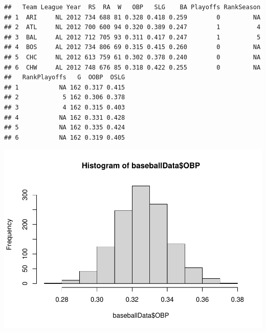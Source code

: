 \documentclass[
]{article}
\newenvironment{Shaded}{\begin{snugshade}}{\end{snugshade}}
\newcommand{\KeywordTok}[1]{\textcolor[rgb]{0.13,0.29,0.53}{\textbf{#1}}}
\newcommand{\NormalTok}[1]{#1}
\newcommand{\OperatorTok}[1]{\textcolor[rgb]{0.81,0.36,0.00}{\textbf{#1}}}
\begin{document}
\begin{verbatim}
##   Team League Year  RS  RA  W   OBP   SLG    BA Playoffs RankSeason
## 1  ARI     NL 2012 734 688 81 0.328 0.418 0.259        0         NA
## 2  ATL     NL 2012 700 600 94 0.320 0.389 0.247        1          4
## 3  BAL     AL 2012 712 705 93 0.311 0.417 0.247        1          5
## 4  BOS     AL 2012 734 806 69 0.315 0.415 0.260        0         NA
## 5  CHC     NL 2012 613 759 61 0.302 0.378 0.240        0         NA
## 6  CHW     AL 2012 748 676 85 0.318 0.422 0.255        0         NA
##   RankPlayoffs   G  OOBP  OSLG
## 1           NA 162 0.317 0.415
## 2            5 162 0.306 0.378
## 3            4 162 0.315 0.403
## 4           NA 162 0.331 0.428
## 5           NA 162 0.335 0.424
## 6           NA 162 0.319 0.405
\end{verbatim}

\begin{Shaded}
\end{Shaded}

\includegraphics{HW2_Liu-Zi-Jian_files/figure-latex/unnamed-chunk-30-1.pdf}

\begin{Shaded}
\end{Shaded}
\end{document}
